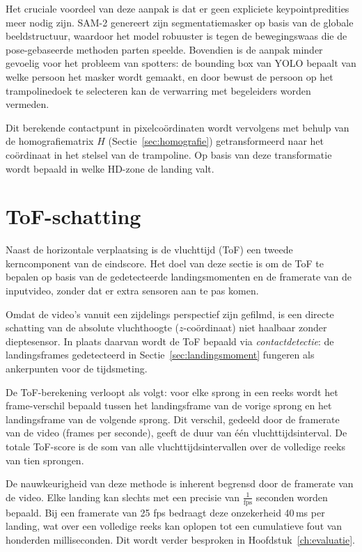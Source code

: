 Het cruciale voordeel van deze aanpak is dat er geen expliciete keypointpredities meer nodig zijn. SAM-2 genereert zijn segmentatiemasker op basis van de globale beeldstructuur, waardoor het model robuuster is tegen de bewegingswaas die de pose-gebaseerde methoden parten speelde. Bovendien is de aanpak minder gevoelig voor het probleem van spotters: de bounding box van YOLO bepaalt van welke persoon het masker wordt gemaakt, en door bewust de persoon op het trampolinedoek te selecteren kan de verwarring met begeleiders worden vermeden.

Dit berekende contactpunt in pixelco{\"o}rdinaten wordt vervolgens met behulp van de homografiematrix $H$ (Sectie~\ref{sec:homografie}) getransformeerd naar het co{\"o}rdinaat in het stelsel van de trampoline. Op basis van deze transformatie wordt bepaald in welke HD-zone de landing valt.


\section{ToF-schatting}
\label{sec:tof}

Naast de horizontale verplaatsing is de vluchttijd (ToF) een tweede kerncomponent van de eindscore. Het doel van deze sectie is om de ToF te bepalen op basis van de gedetecteerde landingsmomenten en de framerate van de inputvideo, zonder dat er extra sensoren aan te pas komen.

Omdat de video's vanuit een zijdelings perspectief zijn gefilmd, is een directe schatting van de absolute vluchthoogte ($z$-co{\"o}rdinaat) niet haalbaar zonder dieptesensor. In plaats daarvan wordt de ToF bepaald via \textit{contactdetectie}: de landingsframes gedetecteerd in Sectie~\ref{sec:landingsmoment} fungeren als ankerpunten voor de tijdsmeting.

De ToF-berekening verloopt als volgt: voor elke sprong in een reeks wordt het frame-verschil bepaald tussen het landingsframe van de vorige sprong en het landingsframe van de volgende sprong. Dit verschil, gedeeld door de framerate van de video (frames per seconde), geeft de duur van één vluchttijdsinterval. De totale ToF-score is de som van alle vluchttijdsintervallen over de volledige reeks van tien sprongen.

De nauwkeurigheid van deze methode is inherent begrensd door de framerate van de video. Elke landing kan slechts met een precisie van $\tfrac{1}{\text{fps}}$ seconden worden bepaald. Bij een framerate van 25 fps bedraagt deze onzekerheid 40\,ms per landing, wat over een volledige reeks kan oplopen tot een cumulatieve fout van honderden milliseconden. Dit wordt verder besproken in Hoofdstuk~\ref{ch:evaluatie}.
